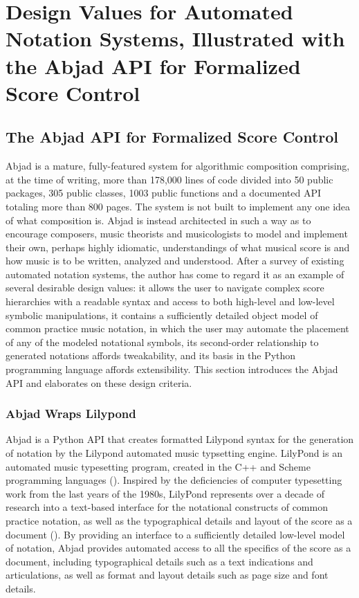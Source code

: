 \section{Design Values for Automated Notation Systems, Illustrated with the Abjad API for Formalized Score Control}
\subsection{The Abjad API for Formalized Score Control}
Abjad is a mature, fully-featured system for algorithmic composition comprising, at the time of writing, more than 178,000 lines of code divided into 50 public packages, 305 public classes, 1003 public functions and a documented API totaling more than 800 pages. The system is not built to implement any one idea of what composition is. Abjad is instead architected in such a way as to encourage composers, music theorists and musicologists to model and implement their own, perhaps highly idiomatic, understandings of what musical score is and how music is to be written, analyzed and understood. After a survey of existing automated notation systems, the author has come to regard it as an example of several desirable design values: it allows the user to navigate complex score hierarchies with a readable syntax and access to both high-level and low-level symbolic manipulations, it contains a sufficiently detailed object model of common practice music notation, in which the user may automate the placement of any of the modeled notational symbols, its second-order relationship to generated notations affords tweakability, and its basis in the Python programming language affords extensibility. This section introduces the Abjad API and elaborates on these design criteria.

\subsubsection{Abjad Wraps Lilypond}
Abjad is a Python API that creates formatted Lilypond syntax for the generation of notation by the Lilypond automated music typsetting engine. LilyPond is an automated music typesetting program, created in the C++ and Scheme programming languages (\cite{Nienhuys:2003ve}). Inspired by the deficiencies of computer typesetting work from the last years of the 1980s, LilyPond represents over a decade of research into a text-based interface for the notational constructs of common practice notation, as well as the typographical details and layout of the score as a document (\cite{Schankler:2013mi}). By providing an interface to a sufficiently detailed low-level model of notation, Abjad provides automated access to all the specifics of the score as a document, including typographical details such as a text indications and articulations, as well as format and layout details such as page size and font details.

